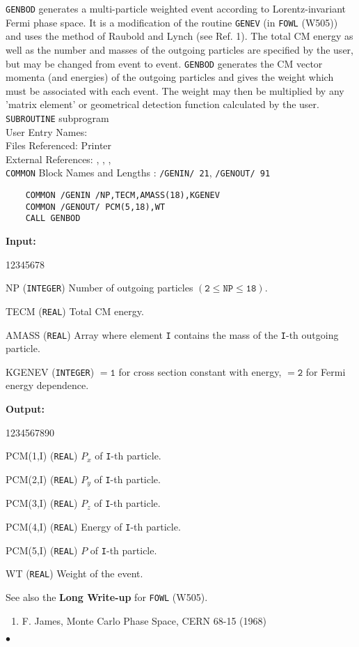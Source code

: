                        
                        
\Submitter{}                             
{\tt GENBOD} generates a multi-particle weighted event according to
Lorentz-invariant Fermi phase space. It is a modification of the
routine {\tt GENEV} (in {\tt FOWL} (W505)) and uses the method of
Raubold and Lynch (see Ref. 1).
The total CM energy as well as the number and masses of the
outgoing particles are specified by the user, but may be changed
from event to event. {\tt GENBOD} generates the CM vector momenta
(and energies) of the outgoing particles and gives the weight which
must be associated with each event. The weight may then be
multiplied by any 'matrix element' or geometrical detection function
calculated by the user.
\Structure
{\tt SUBROUTINE} subprogram \\
User Entry Names: \\
Files Referenced: Printer\\
External References: , ,
,  \\
{\tt COMMON} Block Names and Lengths : {\tt /GENIN/ 21},
{\tt /GENOUT/ 91}
\Usage
\begin{verbatim}
    COMMON /GENIN /NP,TECM,AMASS(18),KGENEV
    COMMON /GENOUT/ PCM(5,18),WT
    CALL GENBOD
\end{verbatim}
{\bf Input:}
\begin{DLtt}{12345678}
\item [NP] ({\tt INTEGER}) Number of outgoing particles
$\mathtt{(2 \leq NP \leq 18)}$.
\item [TECM] ({\tt REAL}) Total CM energy.
\item [AMASS]({\tt REAL}) Array where element {\tt I} contains the
mass of the {\tt I}-th outgoing particle.
\item [KGENEV] ({\tt INTEGER})
$\mathtt{= 1}$ for cross section constant with energy,
$\mathtt{= 2}$ for Fermi energy dependence.
\end{DLtt}
{\bf Output:}
\begin{DLtt}{1234567890}
\item [PCM(1,I)] ({\tt REAL}) $P_x$ of {\tt I}-th particle.
\item [PCM(2,I)] ({\tt REAL}) $P_y$ of {\tt I}-th particle.
\item [PCM(3,I)] ({\tt REAL}) $P_z$ of {\tt I}-th particle.
\item [PCM(4,I)] ({\tt REAL}) Energy of {\tt I}-th particle.
\item [PCM(5,I)] ({\tt REAL}) $P$ of {\tt I}-th particle.
\item [WT] ({\tt REAL}) Weight of the event.
\end{DLtt}
See also the {\bf Long Write-up} for {\tt FOWL} (W505).
\Refer
\begin{enumerate}
\item F. James, Monte Carlo Phase Space, CERN 68-15 (1968)
\end{enumerate}
$\bullet$
